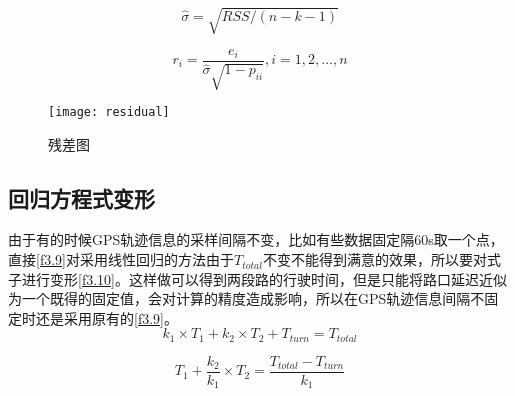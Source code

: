 \begin{equation}
\hat{\sigma}=\sqrt{RSS/(n-k-1)}
\label{f3.11}
\end{equation}

\begin{equation}
r_{i} = \frac{e_{i}}{\hat{\sigma}\sqrt{1-p_{ii}}}, i = 1,2,...,n
\label{f3.12}
\end{equation}

\begin{figure}[H] 
  \centering
  \texttt{[image: residual]}
  \caption{残差图}
  \label{fig:3.4}
\end{figure}

\subsection{回归方程式变形}
由于有的时候GPS轨迹信息的采样间隔不变，比如有些数据固定隔60s取一个点，直接\ref{f3.9}对采用线性回归的方法由于$T_{total}$不变不能得到满意的效果，所以要对式子进行变形\ref{f3.10}。这样做可以得到两段路的行驶时间，但是只能将路口延迟近似为一个既得的固定值，会对计算的精度造成影响，所以在GPS轨迹信息间隔不固定时还是采用原有的\ref{f3.9}。
\begin{equation}
k_{1} \times T_{1} + k_{2} \times T_{2} + T_{turn} = T_{total}
\label{f3.9}
\end{equation}

\begin{equation}
T_{1} + \frac{k_{2}}{k_{1}} \times T_{2}  = \frac{T_{total} - T_{turn}}{k_{1}}
\label{f3.10}
\end{equation}